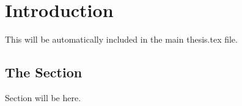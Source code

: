 \chapter{Introduction}

This will be automatically included in the main thesis.tex file.\cite{Leo:1994ur}

\section{The Section}

Section will be here.
